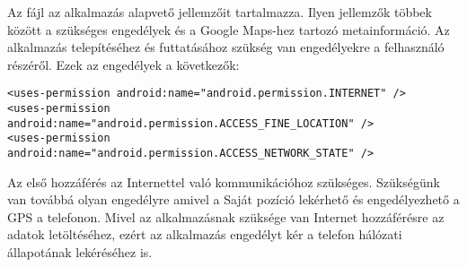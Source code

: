 Az  fájl az alkalmazás alapvető jellemzőit tartalmazza.
Ilyen jellemzők többek között a szükséges engedélyek és a Google Maps-hez tartozó metainformáció.
Az alkalmazás telepítéséhez és futtatásához szükség van engedélyekre a felhasználó részéről.
Ezek az engedélyek a következők:
\begin{lstlisting}
<uses-permission android:name="android.permission.INTERNET" /> 
<uses-permission android:name="android.permission.ACCESS_FINE_LOCATION" />
<uses-permission android:name="android.permission.ACCESS_NETWORK_STATE" />
\end{lstlisting}
Az első hozzáférés az Internettel való kommunikációhoz szükséges.
Szükségünk van továbbá olyan engedélyre amivel a Saját pozíció lekérhető és engedélyezhető a GPS a telefonon.
Mivel az alkalmazásnak szüksége van Internet hozzáférésre az adatok letöltéséhez, ezért az alkalmazás engedélyt kér a telefon hálózati állapotának lekéréséhez is.

